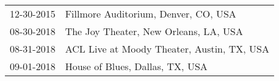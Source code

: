 \begin{supertabular}{ll}
 12-30-2015 &        Fillmore Auditorium, Denver, CO, USA \\
 08-30-2018 &      The Joy  Theater, New Orleans, LA, USA \\
 08-31-2018 &  ACL Live at Moody Theater, Austin, TX, USA \\
 09-01-2018 &             House of Blues, Dallas, TX, USA \\
\end{supertabular}

